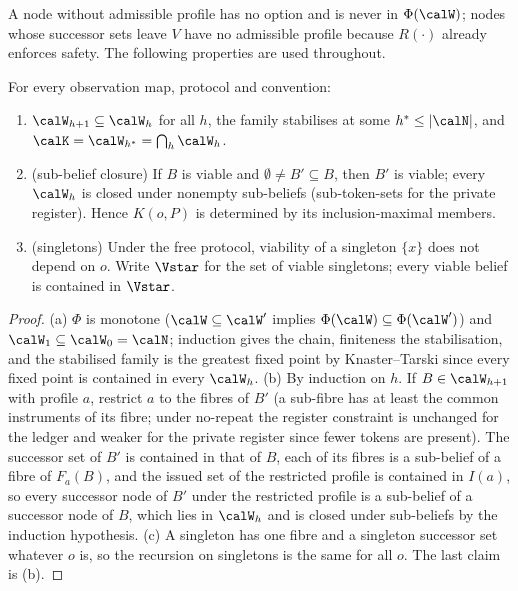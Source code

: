 A node without admissible profile has no option and is never in $\Phi(\calW)$; nodes whose successor sets leave $V$ have no admissible profile because $R(\cdot)$ already enforces safety. The following properties are used throughout.

\begin{lemma}\label{lem:basic}
For every observation map, protocol and convention:
\begin{enumerate}[label=(\alph*),leftmargin=2em,itemsep=1pt]
\item $\calW_{h+1}\subseteq\calW_h$ for all $h$, the family stabilises at some $h^{\ast}\le|\calN|$, and $\calK=\calW_{h^{\ast}}=\bigcap_h\calW_h$.
\item (sub-belief closure) If $B$ is viable and $\emptyset\neq B'\subseteq B$, then $B'$ is viable; every $\calW_h$ is closed under nonempty sub-beliefs (sub-token-sets for the private register). Hence $K(o,P)$ is determined by its inclusion-maximal members.
\item (singletons) Under the free protocol, viability of a singleton $\{x\}$ does not depend on $o$. Write $\Vstar$ for the set of viable singletons; every viable belief is contained in $\Vstar$.
\end{enumerate}
\end{lemma}

\begin{proof}
(a) $\Phi$ is monotone ($\calW\subseteq\calW'$ implies $\Phi(\calW)\subseteq\Phi(\calW')$) and $\calW_1\subseteq\calW_0=\calN$; induction gives the chain, finiteness the stabilisation, and the stabilised family is the greatest fixed point by Knaster--Tarski since every fixed point is contained in every $\calW_h$.
(b) By induction on $h$. If $B\in\calW_{h+1}$ with profile $a$, restrict $a$ to the fibres of $B'$ (a sub-fibre has at least the common instruments of its fibre; under no-repeat the register constraint is unchanged for the ledger and weaker for the private register since fewer tokens are present). The successor set of $B'$ is contained in that of $B$, each of its fibres is a sub-belief of a fibre of $F_a(B)$, and the issued set of the restricted profile is contained in $I(a)$, so every successor node of $B'$ under the restricted profile is a sub-belief of a successor node of $B$, which lies in $\calW_h$ and is closed under sub-beliefs by the induction hypothesis.
(c) A singleton has one fibre and a singleton successor set whatever $o$ is, so the recursion on singletons is the same for all $o$. The last claim is (b).
\end{proof}


